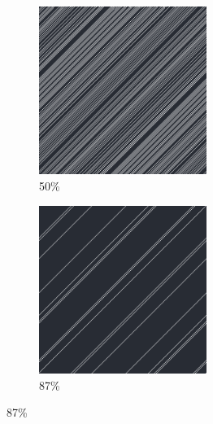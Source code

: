 \documentclass[12pt, fleqn]{report}                             %
\theoremstyle{break}                                            %
\begin{document}
\begin{figure}[ht!]
\begin{subfigure}[b]{0.4\linewidth}
          \includegraphics[width=0.6\textwidth]{Images/6/c.png}
          \caption{50\%}
        \end{subfigure}
        \begin{subfigure}[b]{0.4\linewidth}
          \includegraphics[width=0.6\textwidth]{Images/6/d.png}
          \caption{87\%}
        \end{subfigure}
      \end{figure}
\end{document}
